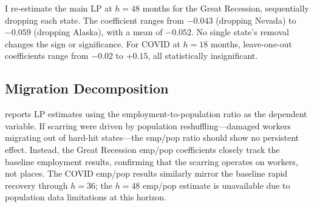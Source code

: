 \documentclass[12pt]{article}
\begin{document}
I re-estimate the main LP at $h = 48$ months for the Great Recession, sequentially dropping each state. The coefficient ranges from $-0.043$ (dropping Nevada) to $-0.059$ (dropping Alaska), with a mean of $-0.052$. No single state's removal changes the sign or significance. For COVID at $h = 18$ months, leave-one-out coefficients range from $-0.02$ to $+0.15$, all statistically insignificant.

\subsection{Migration Decomposition}

 reports LP estimates using the employment-to-population ratio as the dependent variable. If scarring were driven by population reshuffling---damaged workers migrating out of hard-hit states---the emp/pop ratio should show no persistent effect. Instead, the Great Recession emp/pop coefficients closely track the baseline employment results, confirming that the scarring operates on workers, not places. The COVID emp/pop results similarly mirror the baseline rapid recovery through $h=36$; the $h=48$ emp/pop estimate is unavailable due to population data limitations at this horizon.
\end{document}
